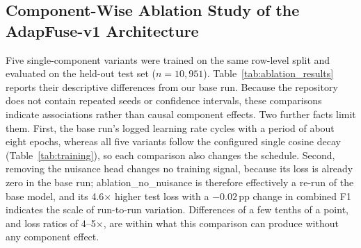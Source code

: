 \documentclass[journal]{IEEEtran}
\begin{document}
\subsection{Component-Wise Ablation Study of the AdapFuse-v1 Architecture}
\label{sec:component_ablations}

Five single-component variants were trained on the same row-level split and evaluated on the held-out test set ($n=10{,}951$). Table~\ref{tab:ablation_results} reports their descriptive differences from our base run. Because the repository does not contain repeated seeds or confidence intervals, these comparisons indicate associations rather than causal component effects. Two further facts limit them. First, the base run's logged learning rate cycles with a period of about eight epochs, whereas all five variants follow the configured single cosine decay (Table~\ref{tab:training}), so each comparison also changes the schedule. Second, removing the nuisance head changes no training signal, because its loss is already zero in the base run; ablation\_no\_nuisance is therefore effectively a re-run of the base model, and its 4.6$\times$ higher test loss with a $-0.02$\,pp change in combined F1 indicates the scale of run-to-run variation. Differences of a few tenths of a point, and loss ratios of 4--5$\times$, are within what this comparison can produce without any component effect.
\end{document}
